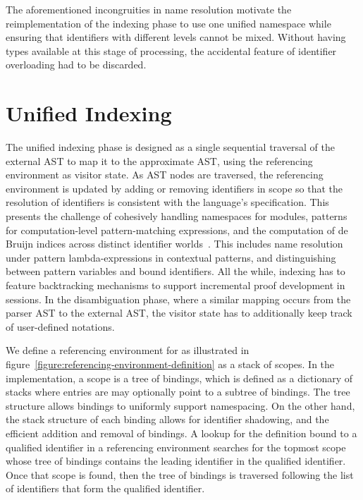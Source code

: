 The aforementioned incongruities in name resolution motivate the reimplementation of the indexing phase to use one unified namespace while ensuring that identifiers with different levels cannot be mixed.
Without having types available at this stage of processing, the accidental feature of identifier overloading had to be discarded.



\section{Unified Indexing}\label{section:indexing}


The unified indexing phase is designed as a single sequential traversal of the external \ac{AST} to map it to the approximate \ac{AST}, using the referencing environment as visitor state.
As \ac{AST} nodes are traversed, the referencing environment is updated by adding or removing identifiers in scope so that the resolution of identifiers is consistent with the language's specification.
This presents the challenge of cohesively handling namespaces for modules, patterns for computation-level pattern-matching expressions, and the computation of de Bruijn indices across distinct identifier worlds~\cite{ferreira2012compiler}.
This includes name resolution under pattern lambda-expressions in contextual \LF patterns, and distinguishing between pattern variables and bound identifiers.
All the while, indexing has to feature backtracking mechanisms to support incremental proof development in \Harpoon sessions.
In the disambiguation phase, where a similar mapping occurs from the parser \ac{AST} to the external \ac{AST}, the visitor state has to additionally keep track of user-defined notations.

We define a referencing environment for \Beluga as illustrated in figure~\ref{figure:referencing-environment-definition} as a stack of scopes.
In the implementation, a scope is a tree of bindings, which is defined as a dictionary of stacks where entries are may optionally point to a subtree of bindings.
The tree structure allows bindings to uniformly support namespacing.
On the other hand, the stack structure of each binding allows for identifier shadowing, and the efficient addition and removal of bindings.
A lookup for the definition bound to a qualified identifier in a referencing environment searches for the topmost scope whose tree of bindings contains the leading identifier in the qualified identifier.
Once that scope is found, then the tree of bindings is traversed following the list of identifiers that form the qualified identifier.

